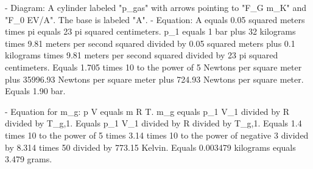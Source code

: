 - Diagram: A cylinder labeled "p_gas" with arrows pointing to "F_G m_K" and "F_0 EV/A". The base is labeled "A".  
- Equation:  
  A equals 0.05 squared meters times pi equals 23 pi squared centimeters.  
  p_1 equals 1 bar plus 32 kilograms times 9.81 meters per second squared divided by 0.05 squared meters plus 0.1 kilograms times 9.81 meters per second squared divided by 23 pi squared centimeters.  
  Equals 1.705 times 10 to the power of 5 Newtons per square meter plus 35996.93 Newtons per square meter plus 724.93 Newtons per square meter.  
  Equals 1.90 bar.  

- Equation for m_g:  
  p V equals m R T.  
  m_g equals p_1 V_1 divided by R divided by T_g,1.  
  Equals p_1 V_1 divided by R divided by T_g,1.  
  Equals 1.4 times 10 to the power of 5 times 3.14 times 10 to the power of negative 3 divided by 8.314 times 50 divided by 773.15 Kelvin.  
  Equals 0.003479 kilograms equals 3.479 grams.